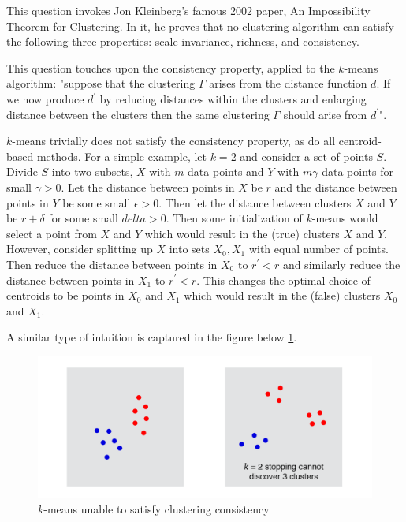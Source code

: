 \documentclass{article}
\begin{document}
    This question invokes Jon Kleinberg's famous 2002 paper, An Impossibility Theorem for Clustering. In it, he proves that no clustering algorithm can satisfy the following three properties: scale-invariance, richness, and consistency.

    This question touches upon the consistency property, applied to the $k$-means algorithm: "suppose that the clustering $\Gamma$ arises from the distance function $d$. If we now produce $d ^ \prime$ by reducing distances within the clusters and enlarging distance between the clusters then the same clustering $\Gamma$ should arise from $d ^ \prime$". 

    $k$-means trivially does not satisfy the consistency property, as do all centroid-based methods. For a simple example, let $k=2$ and consider a set of points $S$. Divide $S$ into two subsets, $X$ with $m$ data points and $Y$ with $m \gamma$ data points for small $\gamma > 0$. Let the distance between points in $X$ be $r$ and the distance between points in $Y$ be some small $\epsilon > 0$. Then let the distance between clusters $X$ and $Y$ be $r + \delta$ for some small $delta > 0$. Then some initialization of $k$-means would select a point from $X$ and $Y$ which would result in the (true) clusters $X$ and $Y$. However, consider splitting up $X$ into sets $X_0, X_1$ with equal number of points. Then reduce the distance between points in $X_0$ to $r ^ \prime < r$ and similarly reduce the distance between points in $X_1$ to $r ^ \prime < r$. This changes the optimal choice of centroids to be points in $X_0$ and $X_1$ which would result in the (false) clusters $X_0$ and $X_1$.

    A similar type of intuition is captured in the figure below \ref{fig:consistency_violation}.

    \begin{figure}[ht]
        \label{fig:consistency_violation}
        \includegraphics[width=0.90\linewidth]{images/q5/k-means_concistency.png}
        \caption{$k$-means unable to satisfy clustering consistency}
    \end{figure}
    \pagebreak
\end{document}
